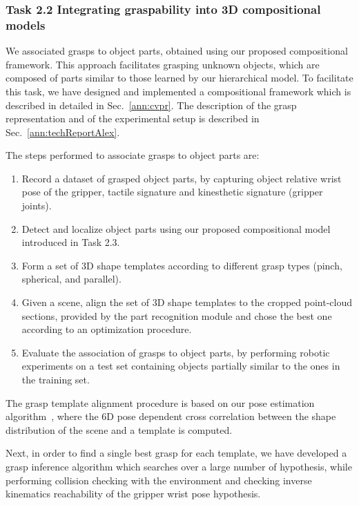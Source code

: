 \documentclass[a4paper,11pt,pdf]{pacmanreport}
\begin{document}

\subsubsection{Task 2.2 Integrating graspability into 3D compositional models}

We associated grasps to object parts, obtained using our proposed compositional framework. This approach facilitates grasping unknown objects, which are composed of parts similar to those learned by our hierarchical model. To facilitate this task, we have designed and implemented a compositional framework which is described in detailed in Sec.~\ref{ann:cvpr}. The description of the grasp representation and of the experimental setup is described in Sec.~\ref{ann:techReportAlex}.%

The steps performed to associate grasps to object parts are:
\begin{enumerate}
\item Record a dataset of grasped object parts, by capturing object relative wrist pose of the gripper, tactile signature and kinesthetic signature (gripper joints).
\item Detect and localize object parts using our proposed compositional model introduced in Task 2.3.
\item Form a set of 3D shape templates according to different grasp types (pinch, spherical, and parallel).
\item Given a scene, align the set of 3D shape templates to the cropped point-cloud sections, provided by the part recognition module and chose the best one according to an optimization procedure.
\item Evaluate the association of grasps to object parts, by performing robotic experiments on a test set containing objects partially similar to the ones in the training set.
\end{enumerate}

The grasp template alignment procedure is based on our pose estimation algorithm~\cite{detry2010ac}, where the 6D pose dependent cross correlation between the shape distribution of the scene and a template is computed. 

Next, in order to find a single best grasp for each template, we have developed a grasp inference algorithm which searches over a large number of hypothesis, while performing collision checking with the environment and checking inverse kinematics reachability of the gripper wrist pose hypothesis.
\end{document}
